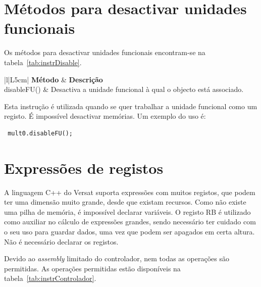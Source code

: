 \section{Métodos para desactivar unidades funcionais }
\label{section:metodos disable}

Os métodos para desactivar unidades funcionais encontram-se na tabela~\ref{tab:instrDisable}.



\begin{table}[h!]
    \caption[Métodos para desactivar unidades funcionais.]{Métodos para desactivar unidades funcionais.}
  \begin{center}
    \begin{tabular}{|l|L{5cm}|}
      \hline
       {\bf Método} & {\bf Descrição} \\
      \hline \hline
      disableFU() & Desactiva a unidade funcional à qual o objecto está associado. \\
      \hline
    \end{tabular}
  \end{center}
  \label{tab:instrDisable}
\end{table}


Esta instrução é utilizada quando se quer trabalhar a unidade funcional como um registo. É impossível desactivar memórias.
Um exemplo do uso é:

\begin{lstlisting}
 mult0.disableFU();
\end{lstlisting}


\section{Expressões de registos}
\label{section:expressoes registos}


A linguagem C++ do Versat suporta expressões com muitos registos, que podem ter uma dimensão muito grande, desde que existam recursos. Como 
não existe uma pilha de memória, é impossível declarar variáveis. O registo RB é utilizado como auxiliar no cálculo de expressões grandes, sendo necessário ter
cuidado com o seu uso para guardar dados, uma vez que podem ser apagados em certa altura. Não é necessário declarar os registos.

Devido ao {\it assembly} limitado do controlador, nem todas as operações são permitidas. As operações permitidas estão disponíveis na tabela~\ref{tab:instrControlador}.

